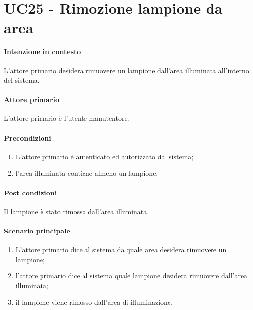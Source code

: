 \section{UC25 - Rimozione lampione da area}\label{uc:25}
\paragraph{Intenzione in contesto} L'attore primario desidera rimuovere un lampione dall'area illuminata all'interno del sistema.
\paragraph{Attore primario} L'attore primario è l'utente manutentore.
\paragraph{Precondizioni}  
\begin{enumerate}
    \item L'attore primario è autenticato ed autorizzato dal sistema;
    \item l'area illuminata contiene almeno un lampione.
\end{enumerate}
\paragraph{Post-condizioni} Il lampione è stato rimosso dall'area illuminata.
\paragraph{Scenario principale}
\begin{enumerate}
    \item L'attore primario dice al sistema da quale area desidera rimuovere un lampione;
    \item l'attore primario dice al sistema quale lampione desidera rimuovere dall'area illuminata;
    \item il lampione viene rimosso dall'area di illuminazione.
\end{enumerate}
